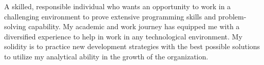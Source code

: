 

\begin{cvparagraph}

A skilled, responsible individual who wants an opportunity to work in a challenging environment to prove extensive programming skills and problem-solving capability. My academic and work journey has equipped me with a diversified experience to help in work in any technological environment. My solidity is to practice new development strategies with the best possible solutions to utilize my analytical ability in the growth of the organization.

\end{cvparagraph}
